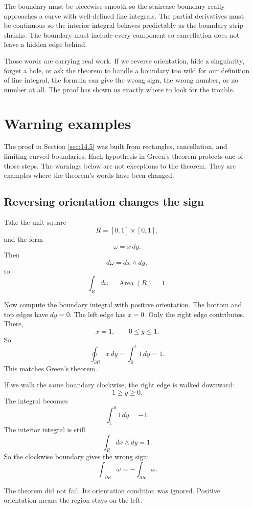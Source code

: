 The boundary must be piecewise smooth so the staircase boundary really approaches a
curve with well-defined line integrals.  The partial derivatives must be continuous so
the interior integral behaves predictably as the boundary strip shrinks.  The boundary
must include every component so cancellation does not leave a hidden edge behind.

Those words are carrying real work.  If we reverse orientation, hide a singularity,
forget a hole, or ask the theorem to handle a boundary too wild for our definition of
line integral, the formula can give the wrong sign, the wrong number, or no number at
all.  The proof has shown us exactly where to look for the trouble.

\section{Warning examples}
\label{sec:14.6}

The proof in Section \ref{sec:14.5} was built from rectangles, cancellation, and limiting
curved boundaries.  Each hypothesis in Green's theorem protects one of those steps.
The warnings below are not exceptions to the theorem.  They are examples where the
theorem's words have been changed.

\subsection{Reversing orientation changes the sign}

Take the unit square
\[
    R=[0,1]\times[0,1],
\]
and the form
\[
    \omega=x\,dy.
\]
Then
\[
    d\omega=dx\wedge dy,
\]
so
\[
    \int_R d\omega=\operatorname{Area}(R)=1.
\]

Now compute the boundary integral with positive orientation.  The bottom and top
edges have \(dy=0\).  The left edge has \(x=0\).  Only the right edge contributes.
There,
\[
    x=1,
    \qquad
    0\le y\le1.
\]
So
\[
    \oint_{\partial R}x\,dy
    =
    \int_0^1 1\,dy
    =
    1.
\]
This matches Green's theorem.

If we walk the same boundary clockwise, the right edge is walked downward:
\[
    1\ge y\ge0.
\]
The integral becomes
\[
    \int_1^0 1\,dy=-1.
\]
The interior integral is still
\[
    \int_R dx\wedge dy=1.
\]
So the clockwise boundary gives the wrong sign:
\[
\boxed{
    \int_{-\partial R}\omega=-\int_{\partial R}\omega.
}
\]

The theorem did not fail.  Its orientation condition was ignored.  Positive orientation
means the region stays on the left.

